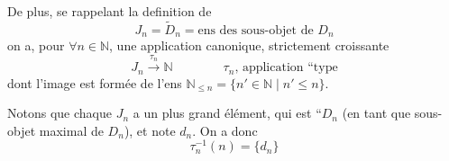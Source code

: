 De plus, se rappelant la definition de
\[
 J_n=\widetilde D_n=\text{ens des sous-objet de }D_n
\]
on a, pour \(\forall n\in\mathbb N\), une application canonique, strictement croissante
\[
 J_n\xrightarrow{\tau_n}\mathbb N \qquad\qquad
 \text{\(\tau_n\), application ``type}
\]
dont l'image est formée  de l'ens
\(\mathbb N_{\leq n}=\{n'\in\mathbb N\mid n'\leq n\}\).

Notons que chaque \(J_n\) a un plus grand élément, qui est ``\(D_n\) (en tant que  sous-objet maximal de \(D_n\)), et  note \(d_n\). On a donc 
\[
 \tau_n^{-1}(n)=\{d_n\}
\]

